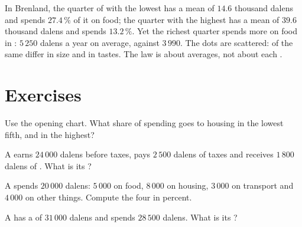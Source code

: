 In Brenland, the quarter of  with the lowest  has a mean  of
$14.6$ thousand dalens and spends $27.4\,\%$ of it on food; the quarter with the highest has a
mean of $39.6$ thousand dalens and spends $13.2\,\%$. Yet the richest quarter spends more on food
in : $5\,250$ dalens a year on average, against $3\,990$. The dots are scattered: 
of the same  differ in size and in tastes. The law is about averages, not about each
.

\section{Exercises}

\begin{exercise}[$\star$]\label{exo:g7:households:1}
Use the opening chart. What share of spending goes to housing in the lowest fifth, and in the
highest?
\end{exercise}

\begin{exercise}[$\star$]\label{exo:g7:households:2}
A  earns $24\,000$ dalens before taxes, pays $2\,500$ dalens of taxes and receives
$1\,800$ dalens of . What is its ?
\end{exercise}

\begin{exercise}[$\star$]\label{exo:g7:households:3}
A  spends $20\,000$ dalens: $5\,000$ on food, $8\,000$ on housing, $3\,000$ on transport and
$4\,000$ on other things. Compute the four  in percent.
\end{exercise}

\begin{exercise}[$\star$]\label{exo:g7:households:4}
A  has a  of $31\,000$ dalens and spends $28\,500$ dalens. What is its
?
\end{exercise}

